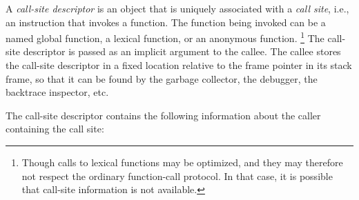 A \emph{call-site descriptor} is an object that is uniquely associated
with a \emph{call site}, i.e., an instruction that invokes a function.
The function being invoked can be a named global function, a lexical
function, or an anonymous function.%
\footnote{Though calls to lexical functions may be optimized, and
  they may therefore not respect the ordinary function-call protocol.
  In that case, it is possible that call-site information is not
  available.}
The call-site descriptor is
passed as an implicit argument to the callee.  The callee stores the
call-site descriptor in a fixed location relative to the frame pointer
in its stack frame, so that it can be found by the garbage collector,
the debugger, the backtrace inspector, etc.

The call-site descriptor contains the following information about the
caller containing the call site:


